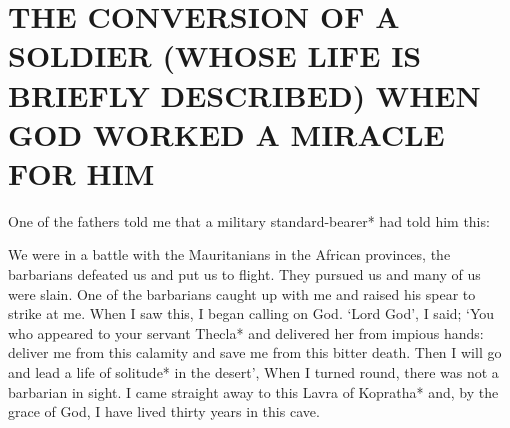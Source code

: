 \chapter{THE CONVERSION OF A SOLDIER (WHOSE LIFE IS BRIEFLY DESCRIBED) WHEN GOD WORKED A MIRACLE FOR HIM}

One of the fathers told me that a military standard-bearer* had told him this:

We were in a battle with the Mauritanians in the African provinces, the barbarians defeated us and put us to flight.
They pursued us and many of us were slain.
One of the barbarians caught up with me and raised his spear to strike at me.
When I saw this, I began calling on God.
`Lord God', I said; `You who appeared to your servant Thecla* and delivered her from impious hands: deliver me from this calamity and save me from this bitter death.
Then I will go and lead a life of solitude* in the desert', When I turned round, there was not a barbarian in sight.
I came straight away to this Lavra of Kopratha* and, by the grace of God, I have lived thirty years in this cave.
